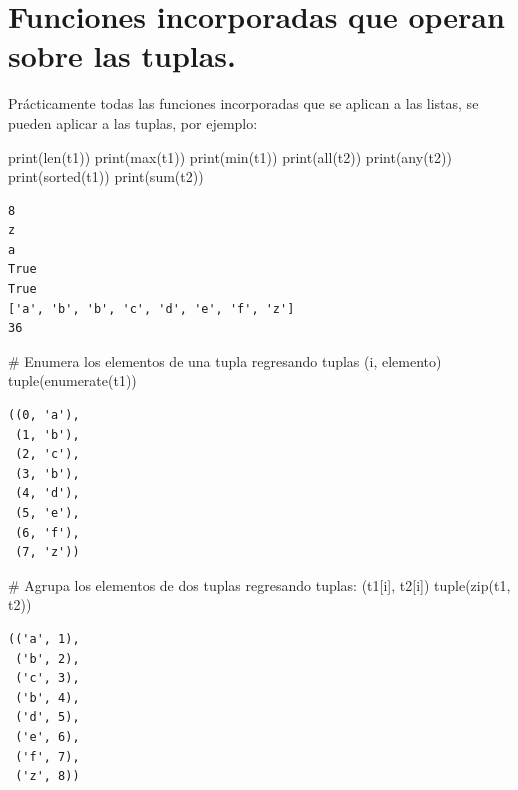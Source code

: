 \documentclass[
  spanish,
  letterpaper,
]{scrbook}
\newenvironment{Shaded}{\begin{snugshade}}{\end{snugshade}}
\newcommand{\BuiltInTok}[1]{\textcolor[rgb]{0.00,0.23,0.31}{#1}}
\newcommand{\CommentTok}[1]{\textcolor[rgb]{0.37,0.37,0.37}{#1}}
\newcommand{\NormalTok}[1]{\textcolor[rgb]{0.00,0.23,0.31}{#1}}
\theoremstyle{definition}
\theoremstyle{remark}
\begin{document}
\section{Funciones incorporadas que operan sobre las
tuplas.}\label{funciones-incorporadas-que-operan-sobre-las-tuplas.}

Prácticamente todas las funciones incorporadas que se aplican a las
listas, se pueden aplicar a las tuplas, por ejemplo:

\begin{Shaded}
\begin{Highlighting}[]
\BuiltInTok{print}\NormalTok{(}\BuiltInTok{len}\NormalTok{(t1))}
\BuiltInTok{print}\NormalTok{(}\BuiltInTok{max}\NormalTok{(t1))}
\BuiltInTok{print}\NormalTok{(}\BuiltInTok{min}\NormalTok{(t1))}
\BuiltInTok{print}\NormalTok{(}\BuiltInTok{all}\NormalTok{(t2))}
\BuiltInTok{print}\NormalTok{(}\BuiltInTok{any}\NormalTok{(t2))}
\BuiltInTok{print}\NormalTok{(}\BuiltInTok{sorted}\NormalTok{(t1))}
\BuiltInTok{print}\NormalTok{(}\BuiltInTok{sum}\NormalTok{(t2))}
\end{Highlighting}
\end{Shaded}

\begin{verbatim}
8
z
a
True
True
['a', 'b', 'b', 'c', 'd', 'e', 'f', 'z']
36
\end{verbatim}

\begin{Shaded}
\begin{Highlighting}[]
\CommentTok{\# Enumera los elementos de una tupla regresando tuplas (i, elemento)}
\BuiltInTok{tuple}\NormalTok{(}\BuiltInTok{enumerate}\NormalTok{(t1)) }
\end{Highlighting}
\end{Shaded}

\begin{verbatim}
((0, 'a'),
 (1, 'b'),
 (2, 'c'),
 (3, 'b'),
 (4, 'd'),
 (5, 'e'),
 (6, 'f'),
 (7, 'z'))
\end{verbatim}

\begin{Shaded}
\begin{Highlighting}[]
\CommentTok{\# Agrupa los elementos de dos tuplas regresando tuplas: (t1[i], t2[i])}
\BuiltInTok{tuple}\NormalTok{(}\BuiltInTok{zip}\NormalTok{(t1, t2)) }
\end{Highlighting}
\end{Shaded}

\begin{verbatim}
(('a', 1),
 ('b', 2),
 ('c', 3),
 ('b', 4),
 ('d', 5),
 ('e', 6),
 ('f', 7),
 ('z', 8))
\end{verbatim}
\end{document}
